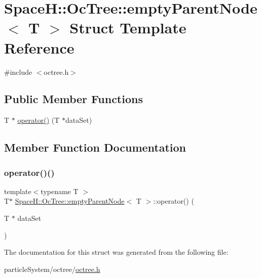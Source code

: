 \hypertarget{struct_space_h_1_1_oc_tree_1_1empty_parent_node}{}\section{SpaceH\+:\+:Oc\+Tree\+:\+:empty\+Parent\+Node$<$ T $>$ Struct Template Reference}
\label{struct_space_h_1_1_oc_tree_1_1empty_parent_node}


{\ttfamily \#include $<$octree.\+h$>$}

\subsection*{Public Member Functions}
\begin{DoxyCompactItemize}
\item 
T $\ast$ \mbox{\hyperlink{struct_space_h_1_1_oc_tree_1_1empty_parent_node_aae8bd4358998eca0a7b1a5005c0bb492}{operator()}} (T $\ast$data\+Set)
\end{DoxyCompactItemize}


\subsection{Member Function Documentation}
\mbox{\label{struct_space_h_1_1_oc_tree_1_1empty_parent_node_aae8bd4358998eca0a7b1a5005c0bb492}} 
\subsubsection{\texorpdfstring{operator()()}{operator()()}}
{\footnotesize\ttfamily template$<$typename T $>$ \\
T$\ast$ \mbox{\hyperlink{struct_space_h_1_1_oc_tree_1_1empty_parent_node}{Space\+H\+::\+Oc\+Tree\+::empty\+Parent\+Node}}$<$ T $>$\+::operator() (\begin{DoxyParamCaption}\item[{T $\ast$}]{data\+Set }\end{DoxyParamCaption})\hspace{0.3cm}{\ttfamily [inline]}}



The documentation for this struct was generated from the following file\+:\begin{DoxyCompactItemize}
\item 
particle\+System/octree/\mbox{\hyperlink{octree_8h}{octree.\+h}}\end{DoxyCompactItemize}
